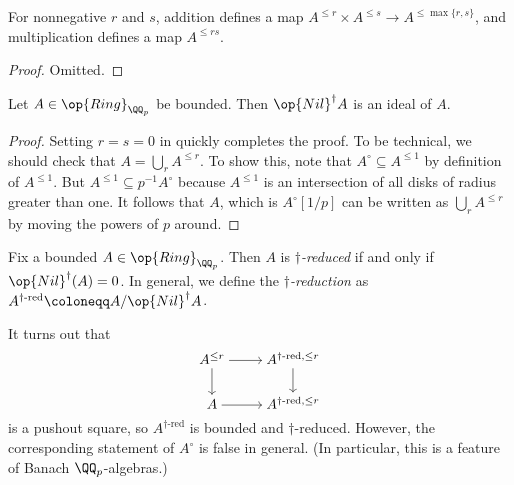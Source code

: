 \documentclass{article}
\begin{document}
\begin{proposition} \label{prop:addition-multiplication-bounded}
	For nonnegative $r$ and $s$, addition defines a map $A^{\le r}\times A^{\le s}\to A^{\le\max\{r,s\}}$, and multiplication defines a map $A^{\le rs}$.
\end{proposition}
\begin{proof}
	Omitted.
\end{proof}
\begin{corollary}
	Let $A\in\op{Ring}_{\QQ_p}$ be bounded. Then $\op{Nil}^\dagger A$ is an ideal of $A$.
\end{corollary}
\begin{proof}
	Setting $r=s=0$ in  quickly completes the proof. To be technical, we should check that $A=\bigcup_rA^{\le r}$. To show this, note that $A^\circ\subseteq A^{\le1}$ by definition of $A^{\le1}$. But $A^{\le1}\subseteq p^{-1}A^\circ$ because $A^{\le1}$ is an intersection of all disks of radius greater than one. It follows that $A$, which is $A^\circ[1/p]$ can be written as $\bigcup_rA^{\le r}$ by moving the powers of $p$ around.
\end{proof}
\begin{definition}
	Fix a bounded $A\in\op{Ring}_{\QQ_p}$. Then $A$ is \textit{$\dagger$-reduced} if and only if $\op{Nil}^\dagger(A)=0$. In general, we define the \textit{$\dagger$-reduction} as $A^{\dagger\textrm{-red}}\coloneqq A/\op{Nil}^\dagger A$.
\end{definition}
\begin{remark} \label{rem:pushout-red}
	It turns out that
	\[\begin{tikzcd}[cramped]
		{A^{\le r}} & {A^{\dagger\textrm{-red},\le r}} \\
		A & {A^{\dagger\textrm{-red},\le r}}
		\arrow[from=1-1, to=1-2]
		\arrow[from=1-1, to=2-1]
		\arrow[from=1-2, to=2-2]
		\arrow[from=2-1, to=2-2]
	\end{tikzcd}\]
	is a pushout square, so $A^{\dagger\textrm{-red}}$ is bounded and $\dagger$-reduced. However, the corresponding statement of $A^\circ$ is false in general. (In particular, this is a feature of Banach $\QQ_p$-algebras.)
\end{remark}
\end{document}
